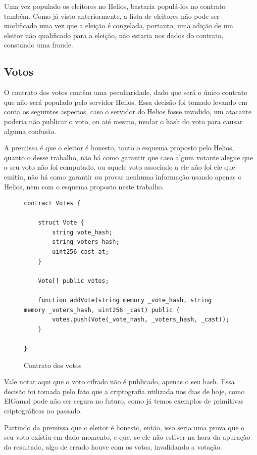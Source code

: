\documentclass{ufsctex/ufsctex}
\begin{document}
Uma vez populado os eleitores no Helios, bastaria populá-los no contrato
também. Como já visto anteriormente, a lista de eleitores não pode ser
modificado uma vez que a eleição é congelada, portanto, uma adição de um
eleitor não qualificado para a eleição, não estaria nos dados do contrato,
constando uma fraude.

\subsection{Votos}

O contrato dos votos contêm uma peculiaridade, dado que será o único contrato
que não será populado pelo servidor Helios. Essa decisão foi tomado levando em
conta os seguintes aspectos, caso o servidor do Helios fosse invadido, um
atacante poderia não publicar o voto, ou até mesmo, mudar o hash do voto para
causar alguma confusão. 

A premissa é que o eleitor é honesto, tanto o esquema proposto pelo Helios,
quanto o desse trabalho, não há como garantir que caso algum votante alegue que
o seu voto não foi computado, ou aquele voto associado a ele não foi ele que
emitiu, não há como garantir ou provar nenhuma informação usando apenas o
Helios, nem com o esquema proposto neste trabalho. 

\begin{figure}[H]
\centering
\begin{lstlisting}[language=Solidity]
contract Votes {
    
    struct Vote {
        string vote_hash;
        string voters_hash;
        uint256 cast_at;
    }
    
    Vote[] public votes;
    
    function addVote(string memory _vote_hash, string memory _voters_hash, uint256 _cast) public {
        votes.push(Vote(_vote_hash, _voters_hash, _cast));
    }
    
}
\end{lstlisting}
	\caption{Contrato dos votos}
\end{figure}

Vale notar aqui que o voto cifrado não é publicado, apenas o seu hash. Essa
decisão foi tomada pelo fato que a criptografia utilizada nos dias de hoje,
como ElGamal pode não ser segura no futuro, como já temos exemplos de
primitivas criptográficas no passado. \cite{breaking}

Partindo da premissa que o eleitor é honesto, então, isso seria uma prova que o
seu voto existiu em dado momento, e que, se ele não estiver na hora da apuração
do resultado, algo de errado houve com os votos, invalidando a votação.
\end{document}
